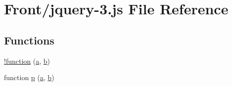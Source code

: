 \hypertarget{jquery-3_8js}{}\section{Front/jquery-\/3.js File Reference}
\label{jquery-3_8js}
\subsection*{Functions}
\begin{DoxyCompactItemize}
\item 
\hyperlink{jquery-3_8js_a43f0b96ea8ec44ca20ba86809a785614}{!function} (\hyperlink{jquery-3_8js_aa4d4888597588a84fd5b1184d00c91f3}{a}, \hyperlink{jquery-3_8js_ac0431efac4d7c393d1e70b86115cb93f}{b})
\item 
function \hyperlink{jquery-3_8js_ae314c6c724250fd29b7ca94473145cef}{p} (\hyperlink{jquery-3_8js_aa4d4888597588a84fd5b1184d00c91f3}{a}, \hyperlink{jquery-3_8js_ac0431efac4d7c393d1e70b86115cb93f}{b})
\item 

\end{DoxyCompactItemize}
